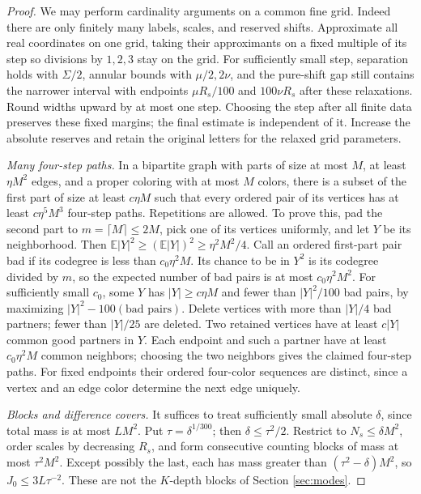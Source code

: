 \documentclass[11pt]{article}
\theoremstyle{definition}
\newcommand{\E}{\mathbb E}
\numberwithin{equation}{section}
\begin{document}
\begin{proof}
We may perform cardinality arguments on a common fine grid. Indeed there are only finitely many labels, scales, and reserved shifts. Approximate all real coordinates on one grid, taking their approximants on a fixed multiple of its step so divisions by $1,2,3$ stay on the grid. For sufficiently small step, separation holds with $\Sigma/2$, annular bounds with $\mu/2,2\nu$, and the pure-shift gap still contains the narrower interval with endpoints $\mu R_s/100$ and $100\nu R_s$ after these relaxations. Round widths upward by at most one step. Choosing the step after all finite data preserves these fixed margins; the final estimate is independent of it. Increase the absolute reserves and retain the original letters for the relaxed grid parameters.

\emph{Many four-step paths.} In a bipartite graph with parts of size at most $M$, at least $\eta M^2$ edges, and a proper coloring with at most $M$ colors, there is a subset of the first part of size at least $c\eta M$ such that every ordered pair of its vertices has at least $c\eta^5M^3$ four-step paths. Repetitions are allowed. To prove this, pad the second part to $m=\lceil M\rceil\le2M$, pick one of its vertices uniformly, and let $Y$ be its neighborhood. Then $\E|Y|^2\ge(\E|Y|)^2\ge\eta^2M^2/4$. Call an ordered first-part pair bad if its codegree is less than $c_0\eta^2M$. Its chance to be in $Y^2$ is its codegree divided by $m$, so the expected number of bad pairs is at most $c_0\eta^2M^2$. For sufficiently small $c_0$, some $Y$ has $|Y|\ge c\eta M$ and fewer than $|Y|^2/100$ bad pairs, by maximizing $|Y|^2-100(\text{bad pairs})$. Delete vertices with more than $|Y|/4$ bad partners; fewer than $|Y|/25$ are deleted. Two retained vertices have at least $c|Y|$ common good partners in $Y$. Each endpoint and such a partner have at least $c_0\eta^2M$ common neighbors; choosing the two neighbors gives the claimed four-step paths. For fixed endpoints their ordered four-color sequences are distinct, since a vertex and an edge color determine the next edge uniquely.

\emph{Blocks and difference covers.} It suffices to treat sufficiently small absolute $\delta$, since total mass is at most $LM^2$. Put $\tau=\delta^{1/300}$; then $\delta\le\tau^2/2$. Restrict to $N_s\le\delta M^2$, order scales by decreasing $R_s$, and form consecutive counting blocks of mass at most $\tau^2M^2$. Except possibly the last, each has mass greater than $(\tau^2-\delta)M^2$, so $J_0\le3L\tau^{-2}$. These are not the $K$-depth blocks of Section \ref{sec:modes}.


\end{proof}
\end{document}
